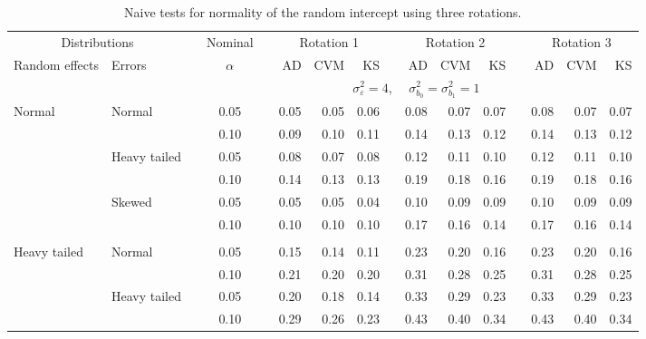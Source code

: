 \documentclass[12pt]{article} %
\begin{document}
\begin{table}[ht]
\caption{Naive tests for normality of the random intercept using three rotations.}
\begin{scriptsize}
\begin{center}
\begin{tabular}{ll p{.1cm} c p{.1cm} rrr p{.1cm} rrr p{.1cm} rrr}
  \hline
  \multicolumn{2}{c}{Distributions}& & Nominal & &  \multicolumn{3}{c}{Rotation 1} & & \multicolumn{3}{c}{Rotation 2} & & \multicolumn{3}{c}{Rotation 3}\\ \cline{1-2} \cline{6-8} \cline{10-12} \cline{14-16}
  Random effects & Errors & & $\alpha$ & & AD & CVM & KS & & AD & CVM & KS & & AD & CVM & KS \\ 
   \hline
& && && \multicolumn{9}{c}{$\sigma_{\varepsilon}^2 = 4$, \ \ $\sigma_{b_0}^2 = \sigma_{b_1}^2 = 1$} \\ \cline{6-16}
\rowcolor{gray!20}Normal       & Normal       && 0.05 &&   0.05 & 0.05 & 0.06 && 0.08 & 0.07 & 0.07 && 0.08 & 0.07 & 0.07 \\ 
\rowcolor{gray!20}             &              && 0.10 &&   0.09 & 0.10 & 0.11 && 0.14 & 0.13 & 0.12 && 0.14 & 0.13 & 0.12 \\ 
\rowcolor{gray!20}             & Heavy tailed && 0.05 &&   0.08 & 0.07 & 0.08 && 0.12 & 0.11 & 0.10 && 0.12 & 0.11 & 0.10 \\ 
\rowcolor{gray!20}             &              && 0.10 &&   0.14 & 0.13 & 0.13 && 0.19 & 0.18 & 0.16 && 0.19 & 0.18 & 0.16 \\ 
\rowcolor{gray!20}             & Skewed       && 0.05 &&   0.05 & 0.05 & 0.04 && 0.10 & 0.09 & 0.09 && 0.10 & 0.09 & 0.09 \\ 
\rowcolor{gray!20}             &              && 0.10 &&   0.10 & 0.10 & 0.10 && 0.17 & 0.16 & 0.14 && 0.17 & 0.16 & 0.14 \\ 
             &&&&&&&&&&&&&&&\\
Heavy tailed & Normal       && 0.05 &&   0.15 & 0.14 & 0.11 && 0.23 & 0.20 & 0.16 && 0.23 & 0.20 & 0.16 \\ 
             &              && 0.10 &&   0.21 & 0.20 & 0.20 && 0.31 & 0.28 & 0.25 && 0.31 & 0.28 & 0.25 \\ 
             & Heavy tailed && 0.05 &&   0.20 & 0.18 & 0.14 && 0.33 & 0.29 & 0.23 && 0.33 & 0.29 & 0.23 \\ 
             &              && 0.10 &&   0.29 & 0.26 & 0.23 && 0.43 & 0.40 & 0.34 && 0.43 & 0.40 & 0.34 \\ 

\end{tabular}
\end{center}
\end{scriptsize}
\end{table}
\end{document}
